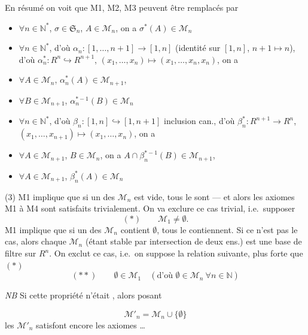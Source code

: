 \documentclass[11pt,a4paper]{article}
\begin{document}
En résumé on voit que M1, M2, M3 peuvent être remplacés par
\begin{itemize}
  \item[a)] \struck{\ill{}} $\forall n \in \mathbb{N}^*$, $\sigma \in
  \mathfrak{S}_n$, $A \in \mathcal{M}_n$, on a $\sigma^*(A) \in \mathcal{M}_n$
  \item[b)] $\forall n \in \mathbb{N}^*$, d'où $\alpha_n : [1, \dots, n+1] \to
  [1, n]$ (identité sur $[1,n]$, $n+1 \mapsto n$), d'où 
  $\alpha_n^* : R^n \hookrightarrow R^{n+1}$, $(x_1, \dots, x_n) \mapsto (x_1,
  \dots, x_n, x_n)$, on a
  \item[b$_1$)] $\forall A \in \mathcal{M}_n$, $\alpha_n^*(A) \in
    \mathcal{M}_{n+1}$,
    \item[b$_2$)] $\forall B \in \mathcal{M}_{n+1}$, $\alpha_n^{*-1}(B) \in
    \mathcal{M}_n$
  \item[c)] $\forall n \in \mathbb{N}^*$, d'où $\beta_n : [1,n]
  \hookrightarrow [1, n+1]$ inclusion can., d'où $\beta_n^* : R^{n+1} \to
  R^n$, $(x_1, \dots, x_{n+1}) \mapsto (x_1, \dots, x_n)$, on a
  \item[c$_1$)] $\forall A \in \mathcal{M}_{n+1}$, $B \in \mathcal{M}_n$, on
    a $A \cap \beta_n^{*-1}(B) \in \mathcal{M}_{n+1}$,
    \item[c$_2$)] $\forall A \in \mathcal{M}_{n+1}$, $\beta_n^*(A) \in
    \mathcal{M}_n$
\end{itemize}

(3) M1 implique que si un des $\mathcal{M}_n$ est vide, tous le sont --- et
alors les axiomes M1 à M4 sont satisfaits trivialement. On va exclure ce cas
trivial, i.e.\ supposer
\[ (*) \qquad \mathcal{M}_1 \neq \emptyset . \]
M1 implique que si un des $\mathcal{M}_n$ contient $\emptyset$, tous le
contiennent. Si ce n'est pas le cas, alors chaque $\mathcal{M}_n$ (étant
stable par intersection de deux ens.) est une base de filtre sur $R^n$. On
exclut ce cas, i.e.\ on suppose la relation suivante, plus forte que $(*)$
\[ (**) \qquad \emptyset \in \mathcal{M}_1 \quad (\text{d'où } \emptyset \in
\mathcal{M}_n \ \forall n \in \mathbb{N}) \]

\emph{NB} Si cette propriété n'était , alors posant

\[ \mathcal{M}'_n = \mathcal{M}_n \cup \{\emptyset\} \]
les $\mathcal{M}'_n$ satisfont encore les axiomes \ldots
\end{document}
